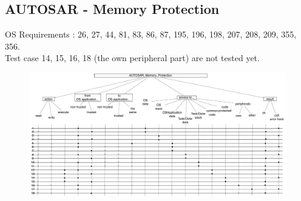 \documentclass[10pt]{article}
\begin{document}
		
	\subsection{AUTOSAR - Memory Protection} \label{memprot}
	OS Requirements : 26, 27, 44, 81, 83, 86, 87, 195, 196, 198, 207, 208, 209, 355, 356.\\
	Test case 14, 15, 16, 18 (the own peripheral part) are not tested yet.\\
	
	\begin{figure}[htbp] %
  		\centering
		\includegraphics[width=1\textwidth]{graphics/AUTOSAR_Memory_Protection.pdf}
	\end{figure}
	
\end{document}
